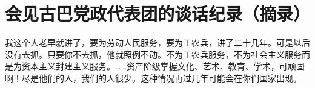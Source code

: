 \section[会见古巴党政代表团的谈话纪录（摘录）（一九六四年十月十六日）]{会见古巴党政代表团的谈话纪录（摘录）}


我这个人老早就讲了，要为劳动人民服务，要为工农兵，讲了二十几年。可是以后没有去抓。只要你不去抓，他就照例不动。不为工农兵服务，不为社会主义服务而是为资本主义封建主义服务。……资产阶级掌握文化、艺术、教育、学术，可顽固啊！尽是他们的人，我们的人很少。这种情况再过几年可能会在你们国家出现。

